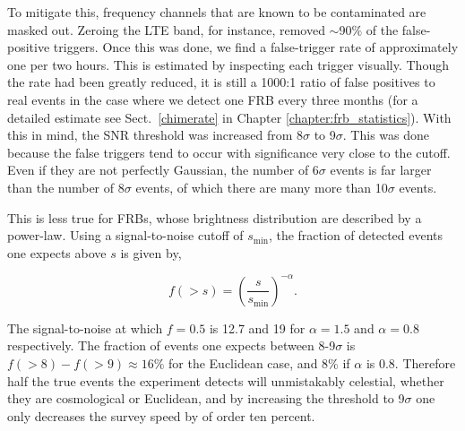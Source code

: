 To mitigate this, frequency channels that are known 
to be contaminated are masked out. Zeroing the LTE band,
for instance, removed $\sim$90$\%$ of the false-positive triggers. 
Once this was done, we find a false-trigger rate of 
approximately one per two hours. This is estimated 
by inspecting each trigger visually. Though the rate 
had been greatly reduced, it is still a 1000:1 ratio of 
false positives to real events in the case where we detect 
one FRB every three months (for a detailed estimate see Sect.~\ref{chimerate}
in Chapter \ref{chapter:frb_statistics}). With this in mind, 
the SNR threshold was increased from 8$\sigma$ to 9$\sigma$. 
This was done because the false triggers tend to occur 
with significance very close to the cutoff. Even if they are 
not perfectly Gaussian, the number of 6$\sigma$ events is 
far larger than the number of 8$\sigma$ events, of which 
there are many more than 10$\sigma$ events. 

This is less true for FRBs, whose brightness distribution 
are described by a power-law. Using a signal-to-noise 
cutoff of $s_\mathrm{min}$, the fraction 
of detected events one expects above $s$ is given by,

\begin{equation}
f(>s) = \left(\frac{s}{s_\mathrm{min}}\right)^{-\alpha}.
\end{equation}

\noindent The signal-to-noise at which $f=0.5$ is 
12.7 and 19 for $\alpha=1.5$ and $\alpha=0.8$ respectively. 
The fraction of events one expects between 8-9$\sigma$ is 
$f(>8) - f(>9) \approx 16\%$ for the Euclidean case, 
and $8\%$ if $\alpha$ is 0.8. Therefore half the true events 
the experiment detects will unmistakably celestial, whether they 
are cosmological or Euclidean, and by increasing the threshold 
to 9$\sigma$ one only decreases the survey speed by of order 
ten percent. 

